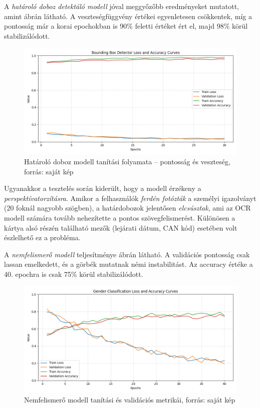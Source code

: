 \documentclass[
]{thesis-ekf}
\theoremstyle{definition}
\theoremstyle{remark}
\begin{document}
A \emph{határoló doboz detektáló modell} jóval meggyőzőbb eredményeket mutatott, amint  ábrán látható. A veszteségfüggvény értékei egyenletesen csökkentek, míg a pontosság már a korai epochokban is 90\% feletti értéket ért el, majd 98\% körül stabilizálódott.

\begin{figure} \centering \includegraphics[width=\textwidth]{ideal_learning_curves} \caption{Határoló doboz modell tanítási folyamata -- pontosság és veszteség, forrás: saját kép} \label{fig-bbox-training} \end{figure}

Ugyanakkor a tesztelés során kiderült, hogy a modell érzékeny a \emph{perspektívatorzításra}. Amikor a felhasználók \emph{ferdén fotózták} a személyi igazolványt (20 foknál nagyobb szögben), a határdobozok jelentősen \emph{elcsúsztak}, ami az OCR modell számára tovább nehezítette a pontos szövegfelismerést. Különösen a kártya alsó részén található mezők (lejárati dátum, CAN kód) esetében volt észlelhető ez a probléma.

A \emph{nemfelismerő modell} teljesítménye  ábrán látható. A validációs pontosság csak lassan emelkedett, és a görbék mutatnak némi instabilitást. Az accuracy értéke a 40. epochra is csak 75\% körül stabilizálódott.

\begin{figure} \centering \includegraphics[width=\textwidth]{gender_learning_curves} \caption{Nemfelismerő modell tanítási és validációs metrikái, forrás: saját kép} \label{fig-gender-training} \end{figure}
\end{document}

